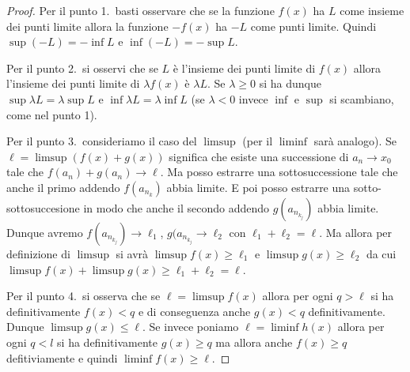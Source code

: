\begin{proof}
  Per il punto 1.\ basti osservare che se la funzione $f(x)$ ha $L$ come
  insieme dei punti limite allora la funzione $-f(x)$ ha $-L$ come punti
  limite. Quindi $\sup (-L) = -\inf L$ e $\inf(-L) = -\sup L$.

  Per il punto 2.\ si osservi che se $L$ è l'insieme dei punti limite
  di $f(x)$ allora l'insieme dei punti limite di $\lambda f(x)$ è $\lambda L$.
  Se $\lambda \ge 0$ si ha dunque $\sup \lambda L = \lambda \sup L$
  e $\inf \lambda L = \lambda \inf L$ (se $\lambda<0$ invece $\inf$ e $\sup$
  si scambiano, come nel punto 1).

  Per il punto 3.\ consideriamo il caso del $\limsup$ (per il $\liminf$ sarà analogo).
  Se $\ell = \limsup(f(x)+g(x))$ significa che esiste una successione
  di $a_n\to x_0$ tale che $f(a_n)+g(a_n)\to \ell$. 
  Ma posso estrarre una sottosuccessione
  tale che anche il primo addendo $f(a_{n_k})$ abbia limite. 
  E poi posso estrarre
  una sotto-sottosuccesione in modo che anche il secondo addendo $g(a_{n_{k_j}})$
  abbia limite. 
  Dunque avremo $f(a_{n_{k_j}}) \to \ell_1$, $g(a_{n_{k_j}} \to \ell_2$
  con $\ell_1+\ell_2=\ell$.
  Ma allora per definizione di $\limsup$ si avrà $\limsup f(x) \ge \ell_1$
  e $\limsup g(x) \ge \ell_2$ da cui $\limsup f(x) + \limsup g(x) \ge \ell_1+\ell_2 = \ell$.

  Per il punto 4.\ si osserva che se $\ell = \limsup f(x)$ allora
  per ogni $q>\ell$ si ha definitivamente
  $f(x)<q$ e di conseguenza anche $g(x) < q$ definitivamente.
  Dunque $\limsup g(x) \le \ell$.
  Se invece poniamo $\ell = \liminf h(x)$ allora
  per ogni $q<l$ si ha definitivamente $g(x) \ge q$ ma
  allora anche $f(x)\ge q$ defitiviamente e quindi
  $\liminf f(x) \ge \ell$.
\end{proof}
    
